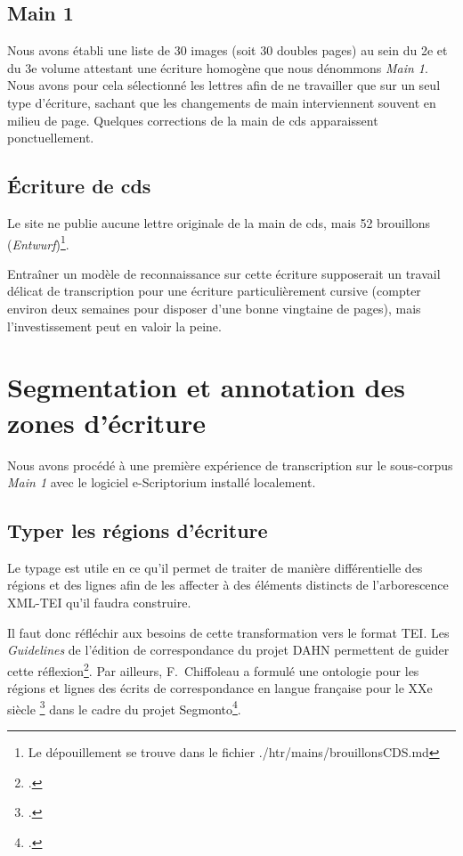 \documentclass[a4paper,12pt,twoside]{book}
\begin{document}
			\subsection{Main 1}
			Nous avons établi une liste de 30 images (soit 30 doubles pages) au sein du 2e et du 3e volume attestant une écriture homogène que nous dénommons \textit{Main 1}. Nous avons pour cela sélectionné les lettres afin de ne travailler que sur un seul type d'écriture, sachant que les changements de main interviennent souvent en milieu de page. Quelques corrections de la main de \gls{cds} apparaissent ponctuellement.
		
			\subsection{Écriture de \gls{cds}}
			Le site ne publie aucune lettre originale de la main de \gls{cds}, mais 52 brouillons (\textit{Entwurf})\footnote{Le dépouillement se trouve dans le fichier \textsf{./htr/mains/brouillonsCDS.md}}.
		
			Entraîner un modèle de reconnaissance sur cette écriture supposerait un travail délicat de transcription pour une écriture particulièrement cursive (compter environ deux semaines pour disposer d'une bonne vingtaine de pages), mais l'investissement peut en valoir la peine.
		
		\section{Segmentation et annotation des zones d'écriture}
		Nous avons procédé à une première expérience de transcription sur le sous-corpus \textit{Main 1} avec le logiciel e-Scriptorium installé localement.
        
            \subsection{Typer les régions d'écriture}
            Le typage est utile en ce qu'il permet de traiter de manière différentielle des régions et des lignes afin de les affecter à des éléments distincts de l'arborescence XML-TEI qu'il faudra construire.
            
            Il faut donc réfléchir aux besoins de cette transformation vers le format TEI. Les \textit{Guidelines} de l'édition de correspondance du projet DAHN permettent de guider cette réflexion\footcite{chiffoleauCorrespondenceGuidelines2022}. Par ailleurs, F.~Chiffoleau a formulé une ontologie pour les régions et lignes des écrits de correspondance en langue française pour le XXe siècle \footcite{chiffoleauCorrespondanceLangueFrancaise2021} dans le cadre du projet \gls{Segmonto}\footcite{gabaySegmOntoCommonVocabulary2021}.
				        
\end{document}
